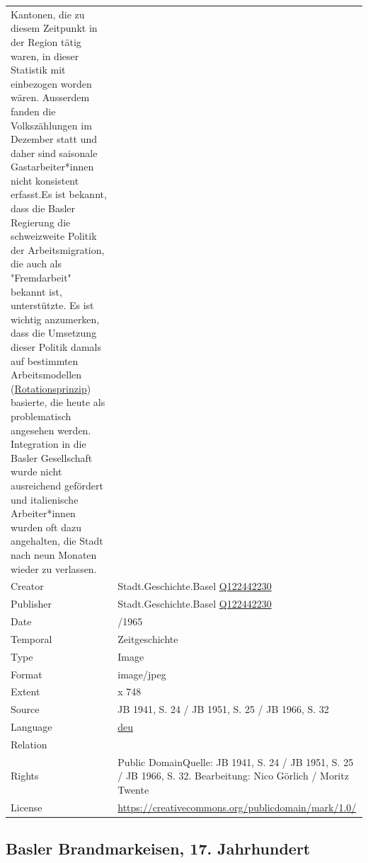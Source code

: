 \documentclass[
  letterpaper,
  DIV=11,
  numbers=noendperiod]{scrartcl}
\begin{document}
\begin{longtable}[]{@{}
  >{\raggedright\arraybackslash}p{}
  >{\raggedright\arraybackslash}p{}@{}}
Kantonen, die zu diesem Zeitpunkt in der Region tätig waren, in dieser
Statistik mit einbezogen worden wären. Ausserdem fanden die
Volkszählungen im Dezember statt und daher sind saisonale
Gastarbeiter*innen nicht konsistent erfasst.Es ist bekannt, dass die
Basler Regierung die schweizweite Politik der Arbeitsmigration, die auch
als "Fremdarbeit" bekannt ist, unterstützte. Es ist wichtig anzumerken,
dass die Umsetzung dieser Politik damals auf bestimmten Arbeitsmodellen
(\href{https://hls-dhs-dss.ch/de/articles/007991/2006-12-07/}{Rotationsprinzip})
basierte, die heute als problematisch angesehen werden. Integration in
die Basler Gesellschaft wurde nicht ausreichend gefördert und
italienische Arbeiter*innen wurden oft dazu angehalten, die Stadt nach
neun Monaten wieder zu verlassen. \\
Creator & Stadt.Geschichte.Basel
\href{https://www.wikidata.org/wiki/Q122442230}{Q122442230} \\
Publisher & Stadt.Geschichte.Basel
\href{https://www.wikidata.org/wiki/Q122442230}{Q122442230} \\
Date & 1920/1965 \\
Temporal & Zeitgeschichte \\
Type & Image \\
Format & image/jpeg \\
Extent & 1686 x 748 \\
Source & JB 1941, S. 24 / JB 1951, S. 25 / JB 1966, S. 32 \\
Language &
\href{https://www.loc.gov/standards/iso639-2/php/langcodes_name.php?code_ID=160}{deu} \\
Relation & \\
Rights & Public DomainQuelle: JB 1941, S. 24 / JB 1951, S. 25 / JB 1966,
S. 32. Bearbeitung: Nico Görlich / Moritz Twente \\
License & \url{https://creativecommons.org/publicdomain/mark/1.0/} \\
\end{longtable}

\subsection{Basler Brandmarkeisen, 17.
Jahrhundert}\label{basler-brandmarkeisen-17.-jahrhundert}
\end{document}
